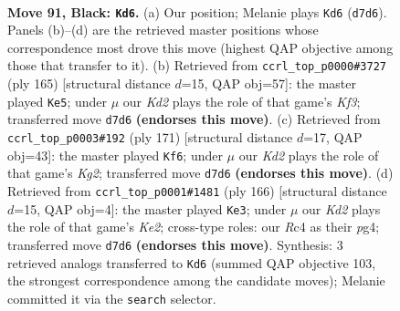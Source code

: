 \documentclass[11pt]{article}
\begin{document}
\clearpage

\begin{figure}[p]\centering
\begin{subfigure}{0.46\textwidth}\centering
\resizebox{\linewidth}{!}{%
\newchessgame
\chessboard[
  setfen={8/3k3R/4pp2/8/P1r1P3/5PK1/1R6/8 b - - 9 91},
  showmover=false,
  pgfstyle=straightmove, color=movearrow, markmove={d7-d6}
]}
\caption{}
\end{subfigure}\hfill
\begin{subfigure}{0.46\textwidth}\centering
\resizebox{\linewidth}{!}{%
\newchessgame
\chessboard[
  setfen={8/8/2R2k2/5p2/2p5/2P3K1/3Pr3/8 b - - 9 83},
  showmover=false,
  pgfstyle=straightmove, color=movearrow, markmove={f6-e5}
]}
\caption{}
\end{subfigure}
\\[4pt]
\begin{subfigure}{0.46\textwidth}\centering
\resizebox{\linewidth}{!}{%
\newchessgame
\chessboard[
  setfen={8/4R1k1/6p1/7p/7P/6P1/r4PK1/8 b - - 79 86},
  showmover=false,
  pgfstyle=straightmove, color=movearrow, markmove={g7-f6}
]}
\caption{}
\end{subfigure}\hfill
\begin{subfigure}{0.46\textwidth}\centering
\resizebox{\linewidth}{!}{%
\newchessgame
\chessboard[
  setfen={8/8/4k3/1R5p/1p4pP/3P2P1/4K3/1r6 w - - 6 84},
  showmover=false,
  pgfstyle=straightmove, color=movearrow, markmove={e2-e3}
]}
\caption{}
\end{subfigure}
\caption{\textbf{Move 91, Black: \texttt{Kd6}.} (a) Our position; Melanie plays \texttt{Kd6} (\texttt{d7d6}). Panels (b)--(d) are the retrieved master positions whose correspondence most drove this move (highest QAP objective among those that transfer to it). (b) Retrieved from \texttt{ccrl\_top\_p0000\#3727} (ply 165) [structural distance $d$=15, QAP obj=57]: the master played \texttt{Ke5}; under $\mu$ our \emph{Kd2} plays the role of that game's \emph{Kf3}; transferred move \texttt{d7d6} \textbf{(endorses this move)}. (c) Retrieved from \texttt{ccrl\_top\_p0003\#192} (ply 171) [structural distance $d$=17, QAP obj=43]: the master played \texttt{Kf6}; under $\mu$ our \emph{Kd2} plays the role of that game's \emph{Kg2}; transferred move \texttt{d7d6} \textbf{(endorses this move)}. (d) Retrieved from \texttt{ccrl\_top\_p0001\#1481} (ply 166) [structural distance $d$=15, QAP obj=4]: the master played \texttt{Ke3}; under $\mu$ our \emph{Kd2} plays the role of that game's \emph{Ke2}; cross-type roles: our \emph{R}c4 as their \emph{p}g4; transferred move \texttt{d7d6} \textbf{(endorses this move)}. Synthesis: 3 retrieved analogs transferred to \texttt{Kd6} (summed QAP objective 103, the strongest correspondence among the candidate moves); Melanie committed it via the \texttt{search} selector.}
\label{fig:thought-m181}
\end{figure}
\end{document}
